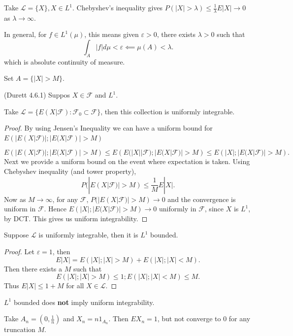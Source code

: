 \begin{example}
	Take $\mathcal{L} = \{X\} , X \in L^1$. Chebyshev's inequality gives $P(|X| > \lambda) \le  \frac{1}{\lambda} E|X| \to  0$ as $\lambda \to \infty $.
	

	In general, for $f \in L^1(\mu)$, this means given $\varepsilon>0$, there exists $\lambda>0$ such that
	\[
		\int _A |f| d \mu < \varepsilon \impliedby \mu(A) < \lambda
	.\] 
	which is absolute continuity of measure.

	Set $A = \{|X| > M\} $.
\end{example}
\begin{example}
	(Durett 4.6.1)
	Suppos $X \in \mathcal{F}$ and $L^1$. 

	Take $\mathcal{L} = \{E(X | \mathcal{F}) : \mathcal{F_0} \subset \mathcal{F}\} $, then this collection is uniformly integrable.
\end{example}
\begin{proof}
	By using Jensen's Inequality we can have a uniform bound for $E\left(|E(X|\mathcal{F})| ; |E(X|\mathcal{F})| > M\right)$

	\[
		E\left(|E(X|\mathcal{F})| ; |E(X|\mathcal{F})| > M\right)
		\le E\left(E(|X||\mathcal{F}) ; |E(X|\mathcal{F})| > M\right)
		\le E\left(|X| ; |E(X|\mathcal{F})| > M\right)
	.\] 
	Next we provide a uniform bound on the event where expectation is taken. Using Chebyshev inequality (and tower property),
	\[
		P(|E(X|\mathcal{F})| > M)
		\le \frac{1}{M} E|X|
	.\] 
	Now as $M \to \infty $, for any $\mathcal{F}$, $P(|E(X|\mathcal{F})| > M) \to 0 $ and the convergence is uniform in $\mathcal{F}$. Hence $E\left(|X| ; |E(X|\mathcal{F})| > M\right) \to 0$ uniformly in $\mathcal{F}$, since $X$ is $L^1$, by DCT. This gives us uniform integrability.
\end{proof}


\begin{proposition}
Suppose $\mathcal{L}$ is uniformly integrable, then it is $L^1$ bounded.
\end{proposition}
\begin{proof}
	

Let $\varepsilon = 1$, then 
\[
	E|X| = E(|X|; |X| > M) + E(|X|; |X|<M)
.\] 
Then there exists a $M$ such that
\[
	E(|X|; |X| > M) \le 1; E(|X|; |X| < M) \le M
.\] 
Thus $E|X| \le  1 + M$ for all $X \in \mathcal{L}$.
\end{proof}

$L^1$ bounded does \textbf{not} imply uniform integrability.
\begin{example}
	Take $A_n = (0, \frac{1}{n})$ and $X_n = n 1_{A_n}$. Then $EX_n = 1$, but not converge to $0$ for any truncation $M$.
\end{example}


